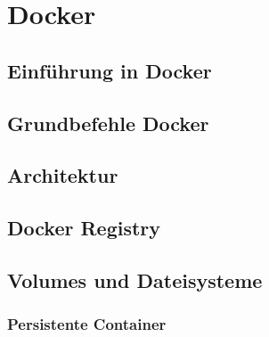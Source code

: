 \chapter{Docker}

\section{Einführung in Docker}

\section{Grundbefehle Docker}

\section{Architektur}


\section{Docker Registry}


\section{Volumes und Dateisysteme}

\subsection{Persistente Container}
